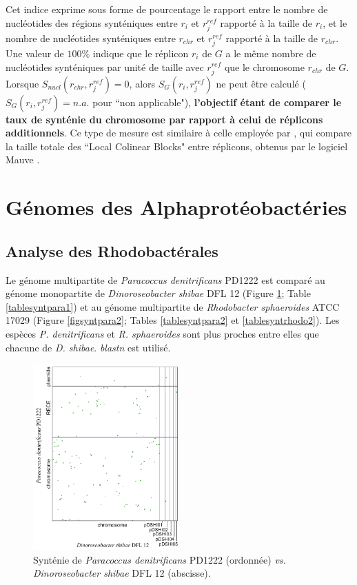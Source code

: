 		Cet indice exprime sous forme de pourcentage le rapport entre le nombre de nucléotides des régions synténiques entre $r_{i}$ et $r^{ref}_{j}$ rapporté à la taille de $r_{i}$, et le nombre de nucléotides synténiques entre $r_{chr}$ et $r^{ref}_{j}$ rapporté à la taille de $r_{chr}$. Une valeur de $100\%$ indique que le réplicon $r_{i}$ de $G$ a le même nombre de nucléotides synténiques par unité de taille avec $r^{ref}_{j}$ que le chromosome $r_{chr}$ de $G$. Lorsque $S_{nucl}(r_{chr},r_{j}^{ref})=0$, alors $S_{G}(r_{i},r^{ref}_{j})$  ne peut être calculé ($S_{G}(r_{i},r^{ref}_{j})=n.a.$  pour ``non applicable"), \textbf{l'objectif étant de comparer le taux de synténie du chromosome par rapport à celui de réplicons additionnels}. Ce type de mesure est similaire à celle employée par \cite{Bavishi2010}, qui compare la taille totale des ``Local Colinear Blocks" entre réplicons, obtenus par le logiciel Mauve \citep{darling2004mauve}. 
  
\section{Génomes des Alphaprotéobactéries}
\subsection{Analyse des Rhodobactérales}\label{parpara}\label{parrhod}\label{parrueg}
   Le génome multipartite de \textit{Paracoccus denitrificans} PD1222 est comparé au génome monopartite de \textit{Dinoroseobacter shibae} DFL 12 (Figure \ref{figsyntpara1}; Table \ref{tablesyntpara1}) et au génome multipartite de \textit{Rhodobacter sphaeroides} ATCC 17029 (Figure \ref{figsyntpara2}; Tables \ref{tablesyntpara2} et \ref{tablesyntrhodo2}). Les espèces \textit{P. denitrificans} et \textit{R. sphaeroides} sont plus proches entre elles que chacune de \textit{D. shibae}. \textit{blastn} est utilisé.    

\begin{figure}[H]
		\begin{center}
			\includegraphics[width=0.5\textwidth]{./img/synteny/new/fig8_1.png}
		\caption[Synténie de \textit{Paracoccus} \textit{vs.} \textit{D. shibae}]{Synténie de \textit{Paracoccus denitrificans} PD1222 (ordonnée) \textit{vs.} \textit{Dinoroseobacter shibae} DFL 12 (abscisse).}\label{figsyntpara1}
		\end{center}
\end{figure}

